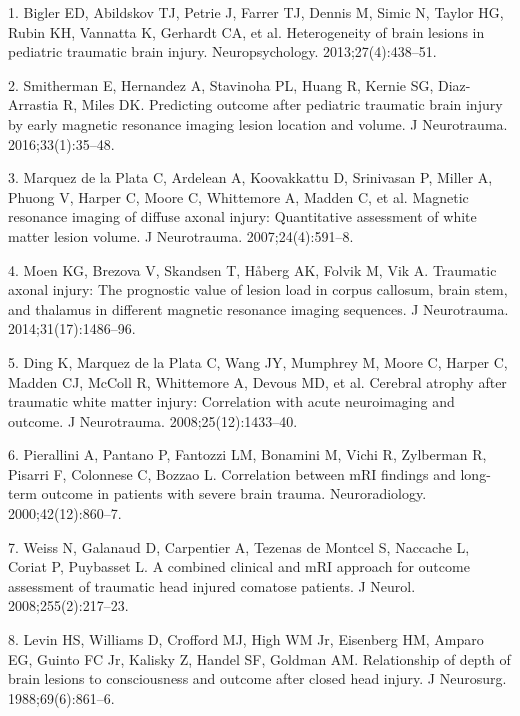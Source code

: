 \documentclass[11pt,]{article}
\begin{document}
\clearpage

\hypertarget{refs}{}
\hypertarget{ref-Bigler:2013aa}{}
1. Bigler ED, Abildskov TJ, Petrie J, Farrer TJ, Dennis M, Simic N,
Taylor HG, Rubin KH, Vannatta K, Gerhardt CA, et al. Heterogeneity of
brain lesions in pediatric traumatic brain injury. Neuropsychology.
2013;27(4):438--51.

\hypertarget{ref-Smitherman:2016aa}{}
2. Smitherman E, Hernandez A, Stavinoha PL, Huang R, Kernie SG,
Diaz-Arrastia R, Miles DK. Predicting outcome after pediatric traumatic
brain injury by early magnetic resonance imaging lesion location and
volume. J Neurotrauma. 2016;33(1):35--48.

\hypertarget{ref-Marquez-de-la-Plata:2007aa}{}
3. Marquez de la Plata C, Ardelean A, Koovakkattu D, Srinivasan P,
Miller A, Phuong V, Harper C, Moore C, Whittemore A, Madden C, et al.
Magnetic resonance imaging of diffuse axonal injury: Quantitative
assessment of white matter lesion volume. J Neurotrauma.
2007;24(4):591--8.

\hypertarget{ref-Moen:2014aa}{}
4. Moen KG, Brezova V, Skandsen T, Håberg AK, Folvik M, Vik A. Traumatic
axonal injury: The prognostic value of lesion load in corpus callosum,
brain stem, and thalamus in different magnetic resonance imaging
sequences. J Neurotrauma. 2014;31(17):1486--96.

\hypertarget{ref-Ding:2008aa}{}
5. Ding K, Marquez de la Plata C, Wang JY, Mumphrey M, Moore C, Harper
C, Madden CJ, McColl R, Whittemore A, Devous MD, et al. Cerebral atrophy
after traumatic white matter injury: Correlation with acute neuroimaging
and outcome. J Neurotrauma. 2008;25(12):1433--40.

\hypertarget{ref-Pierallini:2000aa}{}
6. Pierallini A, Pantano P, Fantozzi LM, Bonamini M, Vichi R, Zylberman
R, Pisarri F, Colonnese C, Bozzao L. Correlation between mRI findings
and long-term outcome in patients with severe brain trauma.
Neuroradiology. 2000;42(12):860--7.

\hypertarget{ref-Weiss:2008aa}{}
7. Weiss N, Galanaud D, Carpentier A, Tezenas de Montcel S, Naccache L,
Coriat P, Puybasset L. A combined clinical and mRI approach for outcome
assessment of traumatic head injured comatose patients. J Neurol.
2008;255(2):217--23.

\hypertarget{ref-Levin:1988aa}{}
8. Levin HS, Williams D, Crofford MJ, High WM Jr, Eisenberg HM, Amparo
EG, Guinto FC Jr, Kalisky Z, Handel SF, Goldman AM. Relationship of
depth of brain lesions to consciousness and outcome after closed head
injury. J Neurosurg. 1988;69(6):861--6.
\end{document}
